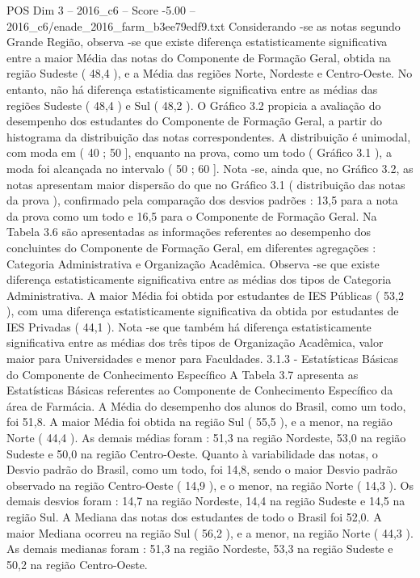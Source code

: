 \begin{textsample}{POS Dim 3 – 2016\_c6 – Score -5.00 – 2016\_c6/enade\_2016\_farm\_b3ee79edf9.txt}
Considerando -se as notas segundo Grande Região, observa -se que existe diferença estatisticamente significativa entre a maior Média das notas do Componente de Formação Geral, obtida na região Sudeste ( 48,4 ), e a Média das regiões Norte, Nordeste e Centro-Oeste.
No entanto, não há diferença estatisticamente significativa entre as médias das regiões Sudeste ( 48,4 ) e Sul ( 48,2 ).
O Gráfico 3.2 propicia a avaliação do desempenho dos estudantes do Componente de Formação Geral, a partir do histograma da distribuição das notas correspondentes.
A distribuição é unimodal, com moda em ( 40 ; 50 ], enquanto na prova, como um todo ( Gráfico 3.1 ), a moda foi alcançada no intervalo ( 50 ; 60 ].
Nota -se, ainda que, no Gráfico 3.2, as notas apresentam maior dispersão do que no Gráfico 3.1 ( distribuição das notas da prova ), confirmado pela comparação dos desvios padrões : 13,5 para a nota da prova como um todo e 16,5 para o Componente de Formação Geral.
Na Tabela 3.6 são apresentadas as informações referentes ao desempenho dos concluintes do Componente de Formação Geral, em diferentes agregações : Categoria Administrativa e Organização Acadêmica.
Observa -se que existe diferença estatisticamente significativa entre as médias dos tipos de Categoria Administrativa.
A maior Média foi obtida por estudantes de IES Públicas ( 53,2 ), com uma diferença estatisticamente significativa da obtida por estudantes de IES Privadas ( 44,1 ).
Nota -se que também há diferença estatisticamente significativa entre as médias dos três tipos de Organização Acadêmica, valor maior para Universidades e menor para Faculdades. 3.1.3 - Estatísticas Básicas do Componente de Conhecimento Específico A Tabela 3.7 apresenta as Estatísticas Básicas referentes ao Componente de Conhecimento Específico da área de Farmácia.
A Média do desempenho dos alunos do Brasil, como um todo, foi 51,8.
A maior Média foi obtida na região Sul ( 55,5 ), e a menor, na região Norte ( 44,4 ).
As demais médias foram : 51,3 na região Nordeste, 53,0 na região Sudeste e 50,0 na região Centro-Oeste.
Quanto à variabilidade das notas, o Desvio padrão do Brasil, como um todo, foi 14,8, sendo o maior Desvio padrão observado na região Centro-Oeste ( 14,9 ), e o menor, na região Norte ( 14,3 ).
Os demais desvios foram : 14,7 na região Nordeste, 14,4 na região Sudeste e 14,5 na região Sul.
A Mediana das notas dos estudantes de todo o Brasil foi 52,0.
A maior Mediana ocorreu na região Sul ( 56,2 ), e a menor, na região Norte ( 44,3 ).
As demais medianas foram : 51,3 na região Nordeste, 53,3 na região Sudeste e 50,2 na região Centro-Oeste.

\end{textsample}
